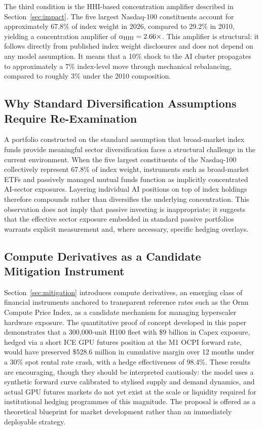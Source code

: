 The third condition is the HHI-based concentration amplifier described in
Section~\ref{sec:impact}. The five largest Nasdaq-100 constituents account for
approximately 67.8\% of index weight in 2026, compared to 29.2\% in 2010, yielding
a concentration amplifier of $\alpha_{\text{HHI}} = 2.66\times$. This amplifier is
structural: it follows directly from published index weight disclosures and does not
depend on any model assumption. It means that a 10\% shock to the AI cluster
propagates to approximately a 7\% index-level move through mechanical rebalancing,
compared to roughly 3\% under the 2010 composition.

\subsection{Why Standard Diversification Assumptions Require Re-Examination}

A portfolio constructed on the standard assumption that broad-market index funds
provide meaningful sector diversification faces a structural challenge in the
current environment. When the five largest constituents of the Nasdaq-100
collectively represent 67.8\% of index weight, instruments such as broad-market
ETFs and passively managed mutual funds function as implicitly concentrated
AI-sector exposures. Layering individual AI positions on top of index holdings
therefore compounds rather than diversifies the underlying concentration. This
observation does not imply that passive investing is inappropriate; it suggests
that the effective sector exposure embedded in standard passive portfolios warrants
explicit measurement and, where necessary, specific hedging overlays.

\subsection{Compute Derivatives as a Candidate Mitigation Instrument}

Section~\ref{sec:mitigation} introduces compute derivatives, an emerging class of
financial instruments anchored to transparent reference rates such as the Ornn
Compute Price Index, as a candidate mechanism for managing hyperscaler hardware
exposure. The quantitative proof of concept developed in this paper demonstrates
that a 300{,}000-unit H100 fleet with \$9 billion in Capex exposure, hedged via a
short ICE GPU futures position at the M1 OCPI forward rate, would have preserved
\$528.6 million in cumulative margin over 12 months under a 30\% spot rental rate
crash, with a hedge effectiveness of 98.4\%. These results are encouraging, though
they should be interpreted cautiously: the model uses a synthetic forward curve
calibrated to stylised supply and demand dynamics, and actual GPU futures markets
do not yet exist at the scale or liquidity required for institutional hedging
programmes of this magnitude. The proposal is offered as a theoretical blueprint
for market development rather than an immediately deployable strategy.

